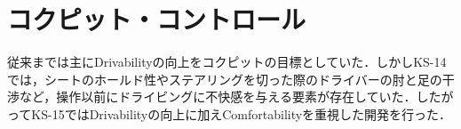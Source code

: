 \section{コクピット・コントロール}
従来までは主にDrivabilityの向上をコクピットの目標としていた．しかしKS-14では，シートのホールド性やステアリングを切った際のドライバーの肘と足の干渉など，操作以前にドライビングに不快感を与える要素が存在していた．したがってKS-15ではDrivabilityの向上に加えComfortabilityを重視した開発を行った．










